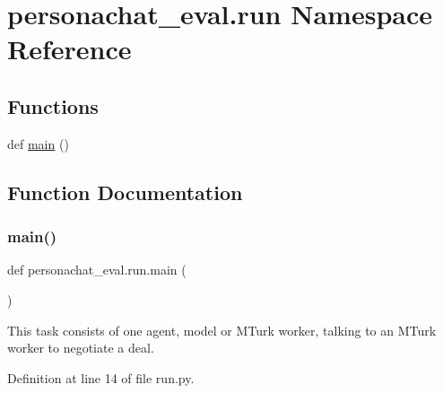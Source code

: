 \hypertarget{namespacepersonachat__eval_1_1run}{}\section{personachat\+\_\+eval.\+run Namespace Reference}
\label{namespacepersonachat__eval_1_1run}
\subsection*{Functions}
\begin{DoxyCompactItemize}
\item 
def \hyperlink{namespacepersonachat__eval_1_1run_a712c8823f07511abe11dce3e1e40f142}{main} ()
\end{DoxyCompactItemize}


\subsection{Function Documentation}
\mbox{\label{namespacepersonachat__eval_1_1run_a712c8823f07511abe11dce3e1e40f142}} 
\subsubsection{\texorpdfstring{main()}{main()}}
{\footnotesize\ttfamily def personachat\+\_\+eval.\+run.\+main (\begin{DoxyParamCaption}{ }\end{DoxyParamCaption})}

\begin{DoxyVerb}This task consists of one agent, model or MTurk worker, talking to an MTurk worker
to negotiate a deal.
\end{DoxyVerb}
 

Definition at line 14 of file run.\+py.


